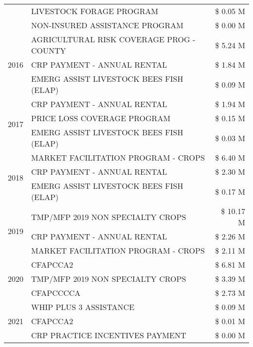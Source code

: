 \begin{tabular}{llr}
 & LIVESTOCK FORAGE PROGRAM & \$ 0.05 M \\
 & NON-INSURED ASSISTANCE PROGRAM & \$ 0.00 M \\
\cline{1-3}
\multirow[t]{3}{*}{2016} & AGRICULTURAL RISK COVERAGE PROG - COUNTY & \$ 5.24 M \\
 & CRP PAYMENT - ANNUAL RENTAL & \$ 1.84 M \\
 & EMERG ASSIST LIVESTOCK BEES FISH (ELAP) & \$ 0.09 M \\
\cline{1-3}
\multirow[t]{3}{*}{2017} & CRP PAYMENT - ANNUAL RENTAL & \$ 1.94 M \\
 & PRICE LOSS COVERAGE PROGRAM & \$ 0.15 M \\
 & EMERG ASSIST LIVESTOCK BEES FISH (ELAP) & \$ 0.03 M \\
\cline{1-3}
\multirow[t]{3}{*}{2018} & MARKET FACILITATION PROGRAM - CROPS & \$ 6.40 M \\
 & CRP PAYMENT - ANNUAL RENTAL & \$ 2.30 M \\
 & EMERG ASSIST LIVESTOCK BEES FISH (ELAP) & \$ 0.17 M \\
\cline{1-3}
\multirow[t]{3}{*}{2019} & TMP/MFP 2019 NON SPECIALTY CROPS & \$ 10.17 M \\
 & CRP PAYMENT - ANNUAL RENTAL & \$ 2.26 M \\
 & MARKET FACILITATION PROGRAM - CROPS & \$ 2.11 M \\
\cline{1-3}
\multirow[t]{3}{*}{2020} & CFAPCCA2 & \$ 6.81 M \\
 & TMP/MFP 2019 NON SPECIALTY CROPS & \$ 3.39 M \\
 & CFAPCCCCA & \$ 2.73 M \\
\cline{1-3}
\multirow[t]{3}{*}{2021} & WHIP PLUS 3 ASSISTANCE & \$ 0.09 M \\
 & CFAPCCA2 & \$ 0.01 M \\
 & CRP PRACTICE INCENTIVES PAYMENT & \$ 0.00 M \\
\cline{1-3}
\bottomrule
\end{tabular}
